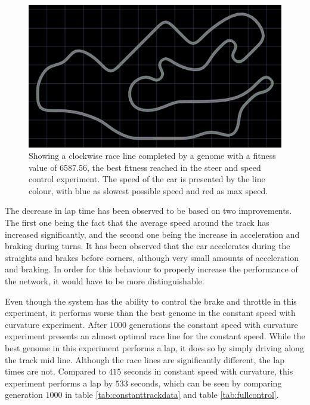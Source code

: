 \begin{figure}[h]
\includegraphics[width=\textwidth]{report/images/normal_generation_6558}
\centering
\caption{Showing a clockwise race line completed by a genome with a fitness value of 6587.56, the best fitness reached in the steer and speed control experiment. The speed of the car is presented by the line colour, with blue as slowest possible speed and red as max speed.}
\label{fig:steerspeedline}
\end{figure}

The decrease in lap time has been observed to be based on two improvements. The first one being the fact that the average speed around the track has increased significantly, and the second one being the increase in acceleration and braking during turns. It has been observed that the car accelerates during the straights and brakes before corners, although very small amounts of acceleration and braking. In order for this behaviour to properly increase the performance of the network, it would have to be more distinguishable.

 
Even though the system has the ability to control the brake and throttle in this experiment, it performs worse than the best genome in the constant speed with curvature experiment. After $1000$ generations the constant speed with curvature experiment presents an almost optimal race line for the constant speed. While the best genome in this experiment performs a lap, it does so by simply driving along the track mid line. Although the race lines are significantly different, the lap times are not. Compared to $415$ seconds in constant speed with curvature, this experiment performs a lap by $533$ seconds, which can be seen by comparing generation $1000$ in table \ref{tab:constanttrackdata} and table \ref{tab:fullcontrol}.

